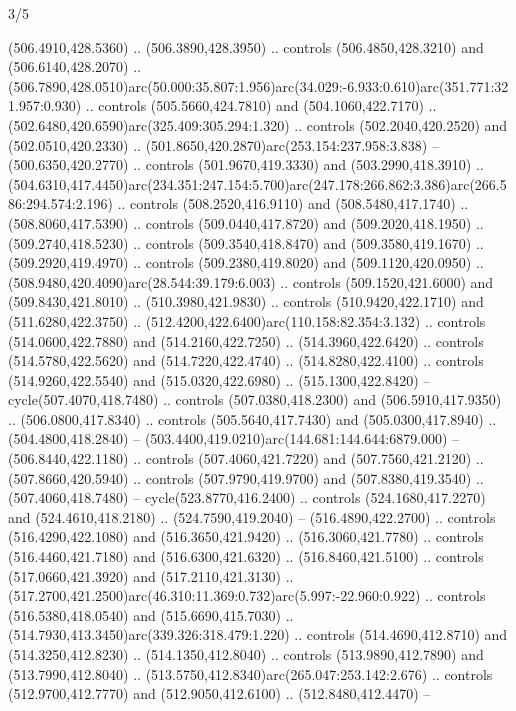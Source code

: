 \begin{flagdescription}{3/5}
\begin{scope}[shift={(0.5\flaglength,0.5\flagwidth)},scale=\flagwidth/510]
\begin{scope}[y=0.80pt, x=0.80pt, yscale=-1.06, xscale=1.06,yshift=-240pt,xshift=-400pt]
\begin{scope}[cm={{0.83333,0.0,0.0,0.83333,(154.64672,48.64761)}}]
\begin{scope}[cm={{0.93334,0.0,0.0,0.93334,(-4.86471,22.64035)}}]
\begin{scope}[draw=black]
  (506.4910,428.5360) .. (506.3890,428.3950) .. controls (506.4850,428.3210) and
  (506.6140,428.2070) ..
  (506.7890,428.0510)arc(50.000:35.807:1.956)arc(34.029:-6.933:0.610)arc(351.771:321.957:0.930)
  .. controls (505.5660,424.7810) and (504.1060,422.7170) ..
  (502.6480,420.6590)arc(325.409:305.294:1.320) .. controls (502.2040,420.2520)
  and (502.0510,420.2330) .. (501.8650,420.2870)arc(253.154:237.958:3.838) --
  (500.6350,420.2770) .. controls (501.9670,419.3330) and (503.2990,418.3910) ..
  (504.6310,417.4450)arc(234.351:247.154:5.700)arc(247.178:266.862:3.386)arc(266.586:294.574:2.196)
  .. controls (508.2520,416.9110) and (508.5480,417.1740) .. (508.8060,417.5390)
  .. controls (509.0440,417.8720) and (509.2020,418.1950) .. (509.2740,418.5230)
  .. controls (509.3540,418.8470) and (509.3580,419.1670) .. (509.2920,419.4970)
  .. controls (509.2380,419.8020) and (509.1120,420.0950) ..
  (508.9480,420.4090)arc(28.544:39.179:6.003) .. controls (509.1520,421.6000)
  and (509.8430,421.8010) .. (510.3980,421.9830) .. controls (510.9420,422.1710)
  and (511.6280,422.3750) .. (512.4200,422.6400)arc(110.158:82.354:3.132) ..
  controls (514.0600,422.7880) and (514.2160,422.7250) .. (514.3960,422.6420) ..
  controls (514.5780,422.5620) and (514.7220,422.4740) .. (514.8280,422.4100) ..
  controls (514.9260,422.5540) and (515.0320,422.6980) .. (515.1300,422.8420) --
  cycle(507.4070,418.7480) .. controls (507.0380,418.2300) and
  (506.5910,417.9350) .. (506.0800,417.8340) .. controls (505.5640,417.7430) and
  (505.0300,417.8940) .. (504.4800,418.2840) --
  (503.4400,419.0210)arc(144.681:144.644:6879.000) -- (506.8440,422.1180) ..
  controls (507.4060,421.7220) and (507.7560,421.2120) .. (507.8660,420.5940) ..
  controls (507.9790,419.9700) and (507.8380,419.3540) .. (507.4060,418.7480) --
  cycle(523.8770,416.2400) .. controls (524.1680,417.2270) and
  (524.4610,418.2180) .. (524.7590,419.2040) -- (516.4890,422.2700) .. controls
  (516.4290,422.1080) and (516.3650,421.9420) .. (516.3060,421.7780) .. controls
  (516.4460,421.7180) and (516.6300,421.6320) .. (516.8460,421.5100) .. controls
  (517.0660,421.3920) and (517.2110,421.3130) ..
  (517.2700,421.2500)arc(46.310:11.369:0.732)arc(5.997:-22.960:0.922) ..
  controls (516.5380,418.0540) and (515.6690,415.7030) ..
  (514.7930,413.3450)arc(339.326:318.479:1.220) .. controls (514.4690,412.8710)
  and (514.3250,412.8230) .. (514.1350,412.8040) .. controls (513.9890,412.7890)
  and (513.7990,412.8040) .. (513.5750,412.8340)arc(265.047:253.142:2.676) ..
  controls (512.9700,412.7770) and (512.9050,412.6100) .. (512.8480,412.4470) --

\end{scope}
\end{scope}
\end{scope}
\end{scope}
\end{scope}
\end{flagdescription}
